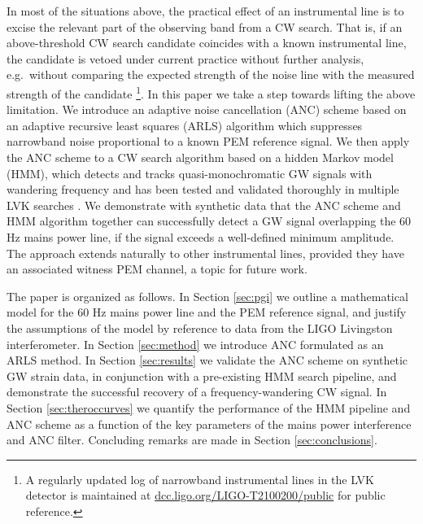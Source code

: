 \documentclass[pra,superscriptaddress,reprint,amsmath,amssymb,nofootinbib]{revtex4-2}
\begin{document}
In most  of the situations above, the practical effect of an instrumental line is to excise the relevant part of the observing band from a CW search. That is, if an above-threshold CW search candidate coincides with a known instrumental line, the candidate is vetoed under current practice without further analysis, e.g.\ without comparing the expected strength of the noise line with the measured strength of the candidate \footnote{A regularly updated log of narrowband instrumental lines in the LVK detector is maintained at \href{https://dcc.ligo.org/LIGO-T2100200/public}{dcc.ligo.org/LIGO-T2100200/public} for public reference.}. In this paper we take a step towards lifting the above limitation. We introduce an adaptive noise cancellation (ANC) scheme  based on an adaptive recursive least squares (ARLS) algorithm which suppresses narrowband noise proportional to a known PEM reference signal. We then apply the ANC scheme to a CW search algorithm based on a hidden Markov model (HMM), which detects and tracks quasi-monochromatic GW signals with wandering frequency and has been tested and validated thoroughly in multiple LVK searches \cite{Suvorova2016PhRv,Piccinni2022,Riles2023,Wette2023}. We demonstrate with synthetic data that the ANC scheme and HMM algorithm together can successfully detect a GW signal overlapping the 60 Hz mains power line, if the signal exceeds a well-defined minimum amplitude. The approach extends naturally to other instrumental lines, provided they have an associated witness PEM channel, a topic for future work. \newline 

The paper is organized as follows. In Section \ref{sec:pgi} we outline a mathematical model for the 60 Hz mains power line and the PEM reference signal, and justify the assumptions of the model by reference to data from the LIGO Livingston interferometer.  In Section \ref{sec:method} we introduce ANC formulated as an ARLS method. In Section \ref{sec:results} we validate the ANC scheme on synthetic GW strain data, in conjunction with a pre-existing HMM search pipeline, and demonstrate the successful recovery of a frequency-wandering CW signal. In Section \ref{sec:theroccurves} we quantify the performance of the HMM pipeline and ANC scheme as a function of the key parameters of the mains power interference and ANC filter. Concluding remarks are made in Section \ref{sec:conclusions}.
\end{document}
